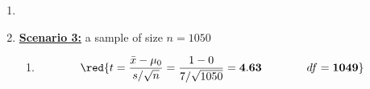 \begin{enumerate}
\begin{enumerate}
\begin{enumerate}
\item  \underline{Decision:}
\begin{itemize}
\item Reject the null hypothesis because the $p$-value $\leq$ $\alpha$.
\item Reject the null hypothesis because the $p$-value $>$ $\alpha$.
\item Fail to reject the null hypothesis because the $p$-value $\leq$ $\alpha$.
\item {}
\end{itemize}
\end{enumerate}
\item[]
\item  \textbf{\underline{Scenario 3:}} a sample of size $n = 1050$\\ 
\begin{enumerate}
\item $$\red{t = \frac{\bar{x} - \mu_0}{s/\sqrt{n}} = \frac{1 - 0}{7/\sqrt{1050}} = \mathbf{4.63} \qquad \qquad df = \mathbf{1049}}$$


\end{enumerate}
\end{enumerate}
\end{enumerate}
